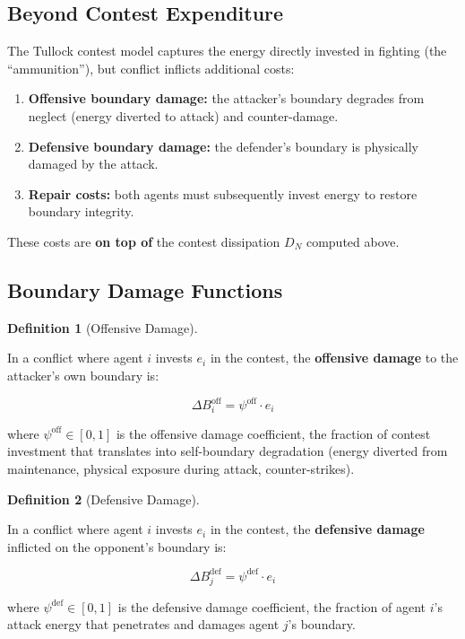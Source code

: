 \documentclass[11pt]{article}
\theoremstyle{plain}
\theoremstyle{definition}
\newtheorem{definition}{Definition}
\theoremstyle{remark}
\let\origsubsection\subsection
\renewcommand{\subsection}{\needspace{7\baselineskip}\origsubsection}
\providecommand{\tightlist}{%
  \setlength{\itemsep}{0pt}\setlength{\parskip}{0pt}}
\begin{document}
\subsection{Beyond Contest
Expenditure}\label{beyond-contest-expenditure}

The Tullock contest model captures the energy directly invested in
fighting (the ``ammunition''), but conflict inflicts additional costs:

\begin{enumerate}
\def\labelenumi{\arabic{enumi}.}
\tightlist
\item
  \textbf{Offensive boundary damage:} the attacker's boundary degrades
  from neglect (energy diverted to attack) and counter-damage.
\item
  \textbf{Defensive boundary damage:} the defender's boundary is
  physically damaged by the attack.
\item
  \textbf{Repair costs:} both agents must subsequently invest energy to
  restore boundary integrity.
\end{enumerate}

These costs are \textbf{on top of} the contest dissipation \(D_N\)
computed above.

\subsection{Boundary Damage Functions}\label{boundary-damage-functions}

\begin{definition}[Offensive Damage]
\label{def-offensive-damage}

In a conflict where agent $i$ invests $e_i$ in the contest, the \textbf{offensive damage} to the attacker's own boundary is:

$$\Delta B_i^{\text{off}} = \psi^{\text{off}} \cdot e_i$$

where $\psi^{\text{off}} \in [0, 1]$ is the offensive damage coefficient, the fraction of contest investment that translates into self-boundary degradation (energy diverted from maintenance, physical exposure during attack, counter-strikes).
\end{definition}

\begin{definition}[Defensive Damage]
\label{def-defensive-damage}

In a conflict where agent $i$ invests $e_i$ in the contest, the \textbf{defensive damage} inflicted on the opponent's boundary is:

$$\Delta B_j^{\text{def}} = \psi^{\text{def}} \cdot e_i$$

where $\psi^{\text{def}} \in [0, 1]$ is the defensive damage coefficient, the fraction of agent $i$'s attack energy that penetrates and damages agent $j$'s boundary.
\end{definition}
\end{document}
